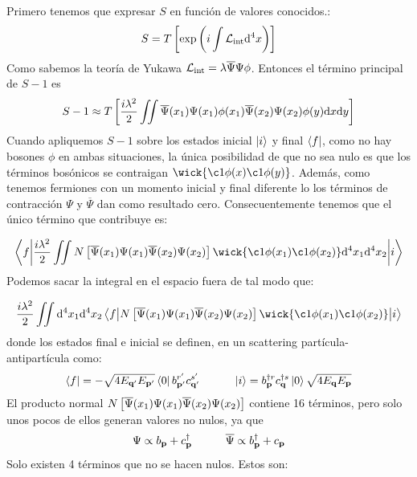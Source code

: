 \begin{solucion} 
	Primero tenemos que expresar $S$ en función de valores conocidos.: 
	\begin{equation}
		S = T\left[   \exp \left(  i \int \mathcal{L}_{\text{int}} \mathrm{d}^4 x  \right)  \right]
	\end{equation}
	Como sabemos la teoría de Yukawa $\mathcal{L}_{\text{int}}= \lambda \overline{\Psi}\Psi \phi$.  Entonces el término principal de $S-1$ es
	\begin{equation*}
		S-1 \approx  T\left[  \frac{i \lambda^2}{2}\iint \overline{\Psi} (x_1) \Psi (x_1)  \phi (x_1)  \overline{\Psi} (x_2)\Psi (x_2) \phi (y)  \mathrm{d} x \mathrm{d} y  \right]
	\end{equation*}
	Cuando apliquemos $S-1$ sobre los estados inicial $\ket{i}$ y final $\bra{f}$, como no hay bosones $\phi$ en ambas situaciones, la única posibilidad de que no sea nulo es que los términos bosónicos se contraigan $\wick{\c1{\phi(x)}\c1{\phi(y)}}$. Además, como tenemos fermiones con un momento inicial y final diferente lo los términos de contracción $\Psi$ y $\overline{\Psi}$ dan como resultado cero. Consecuentemente tenemos que el único término que contribuye es:
	
	\begin{equation*}
		\mel**{f}{\frac{i \lambda^2}{2} \iint  N\ccorchetes{\aPsi (x_1)  \Psi (x_1) \aPsi(x_2)\Psi (x_2) } \wick{\c1{\phi}(x_1)\c1{\phi} (x_2)}  \D^4 x_1 \D^4 x_2 }{i}
	\end{equation*}
	Podemos sacar la integral en el espacio fuera de tal modo que: 
	
	\begin{equation*}
		\frac{i \lambda^2}{2} \iint  \D^4 x_1 \D^4 x_2  \mel**{f}{  N\ccorchetes{\aPsi (x_1)  \Psi (x_1) \aPsi(x_2)\Psi (x_2) } \wick{\c1{\phi}(x_1)\c1{\phi} (x_2)} }{i}
	\end{equation*}
	donde los estados final e inicial se definen, en un scattering partícula-antipartícula como:
	\begin{equation}
		\bra{f} = -\sqrt{4E_{\mathbf{q}'} E_{\mathbf{p}'}} \bra{0} b_{\mathbf{p}'}^{r'} c_{\mathbf{q}'}^{s'} \quad \quad \quad
		\ket{i} =   b_{\mathbf{p}}^{\dagger r} c_{\mathbf{q}}^{\dagger s}  \ket{0}\sqrt{4E_{\mathbf{q}} E_{\mathbf{p}}}
	\end{equation}
	El producto normal $N\left[ \overline{\Psi} (x_1) \Psi (x_1) \overline{\Psi} (x_2) \Psi (x_2)  \right]$ contiene 16 términos, pero solo unos pocos de ellos generan valores no nulos, ya que 
	\begin{equation*}
		\Psi \propto b_{\mathbf{p}} + c_{\mathbf{p}}^\dagger \quad \quad \quad 
		\overline{\Psi} \propto b_{\mathbf{p}}^\dagger + c_{\mathbf{p}} 
	\end{equation*}
	Solo existen 4 términos que no se hacen nulos. Estos son:
	

\end{solucion}
